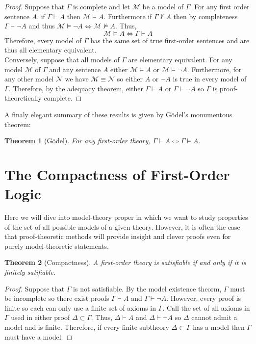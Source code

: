 \documentclass[12pt]{article}
\newcommand{\proves}{\vdash}
\newcommand{\entails}{\models}
\newcommand{\Mmod}{\mathcal{M}}
\newcommand{\Nmod}{\mathcal{N}}
\theoremstyle{theorem}
\newtheorem{theorem}{Theorem}[section]
\theoremstyle{definition}
\theoremstyle{definition}
\theoremstyle{remark}
\theoremstyle{definition}
\theoremstyle{remark}
\begin{document}
\begin{proof}
Suppose that $\Gamma$ is complete and let $\Mmod$ be a model of $\Gamma$.
For any first order sentence $A$, if $\Gamma \proves A$ then $\Mmod \entails A$. Furthermore if $\Gamma \not\proves A$ then by completeness $\Gamma \proves \neg A$ and thus $\Mmod \entails \neg A \iff \Mmod \not\entails A$. Thus, 
\[ \Mmod \entails A \iff \Gamma \proves A \]
Therefore, every model of $\Gamma$ has the same set of true first-order sentences and are thus all elementary equivalent. 
\bigskip\\
Conversely, suppose that all models of $\Gamma$ are elementary equivalent. For any model $\Mmod$ of $\Gamma$ and any sentence $A$ either $\Mmod \entails A$ or $\Mmod \entails \neg A$. Furthermore, for any other model $\Nmod$ we have $\Mmod \equiv \Nmod$ so either $A$ or $\neg A$ is true in every model of $\Gamma$. Therefore, by the adequacy theorem, either $\Gamma \proves A$ or $\Gamma \proves \neg A$ so $\Gamma$ is proof-theoretically complete. 
\end{proof}
A finaly elegant summary of these results is given by G\"{o}del's monumentous theorem:

\begin{theorem}[G\"{o}del]
For any first-order theory, $\Gamma \proves A \iff \Gamma \entails A$. 
\end{theorem}

\section{The Compactness of First-Order Logic}

Here we will dive into model-theory proper in which we want to study properties of the set of all possible models of a given theory. However, it is often the case that proof-theoretic methods will provide insight and clever proofs even for purely model-theoretic statements. 


\begin{theorem}[Compactness]
A first-order theory is satisfiable if and only if it is finitely satifiable. 
\end{theorem}

\begin{proof}
Suppose that $\Gamma$ is not satisfiable. By the model existence theorm, $\Gamma$ must be incomplete so there exist proofs $\Gamma \proves A$ and $\Gamma \proves \neg A$. However, every proof is finite so each can only use a finite set of axioms in $\Gamma$. Call the set of all axioms in $\Gamma$ used in either proof $\Delta \subset \Gamma$. Thus, $\Delta \proves A$ and $\Delta \proves \neg A$ so $\Delta$ cannot admit a model and is finite. Therefore, if every finite subtheory $\Delta \subset \Gamma$ has a model then $\Gamma$ must have a model.
\end{proof}
\end{document}
